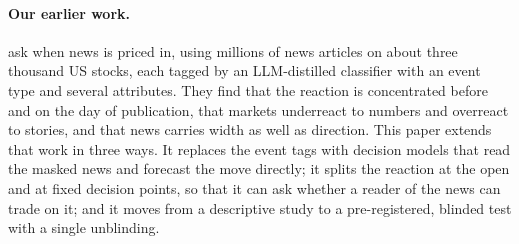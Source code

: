 \paragraph{Our earlier work.} \citet{kargarzadeh2026} ask when news is priced in, using millions of news
articles on about three thousand US stocks, each tagged by an LLM-distilled classifier with an event type and
several attributes. They find that the reaction is concentrated before and on the day of publication, that
markets underreact to numbers and overreact to stories, and that news carries width as well as direction. This
paper extends that work in three ways. It replaces the event tags with decision models that read the masked
news and forecast the move directly; it splits the reaction at the open and at fixed decision points, so that
it can ask whether a reader of the news can trade on it; and it moves from a descriptive study to a
pre-registered, blinded test with a single unblinding.
